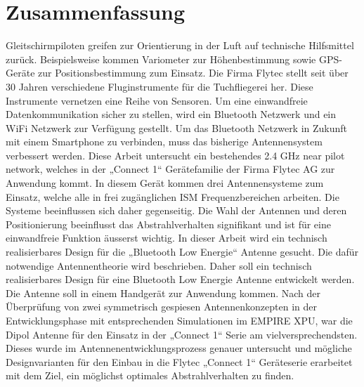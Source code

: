 \section*{Zusammenfassung}

Gleitschirmpiloten greifen zur Orientierung in der Luft auf technische Hilfsmittel zurück. Beispielsweise kommen Variometer zur Höhenbestimmung sowie GPS-Geräte zur Positionsbestimmung zum Einsatz. Die Firma Flytec stellt seit über 30 Jahren verschiedene Fluginstrumente für die Tuchfliegerei her. Diese Instrumente vernetzen eine Reihe von Sensoren. Um eine einwandfreie Datenkommunikation sicher zu stellen, wird ein Bluetooth Netzwerk und ein WiFi Netzwerk zur Verfügung gestellt. Um das Bluetooth Netzwerk in Zukunft mit einem Smartphone zu verbinden, muss das bisherige Antennensystem verbessert werden.
Diese Arbeit untersucht ein bestehendes 2.4 GHz \glqq near pilot network\grqq , welches in der „Connect 1“ Gerätefamilie der Firma Flytec AG zur Anwendung kommt. In diesem  Gerät kommen drei Antennensysteme zum Einsatz, welche alle in frei zugänglichen ISM Frequenzbereichen arbeiten. Die Systeme beeinflussen sich daher gegenseitig. Die Wahl der Antennen und deren Positionierung beeinflusst das Abstrahlverhalten signifikant und ist für eine einwandfreie Funktion äusserst wichtig. In dieser Arbeit wird ein technisch realisierbares Design für die „Bluetooth Low Energie“ Antenne gesucht. Die dafür notwendige Antennentheorie wird beschrieben. Daher soll ein technisch realisierbares Design für eine Bluetooth Low Energie Antenne entwickelt werden. Die Antenne soll in einem Handgerät zur Anwendung kommen. Nach der Überprüfung von zwei symmetrisch gespiesen Antennenkonzepten in der Entwicklungsphase mit entsprechenden Simulationen im EMPIRE XPU, war die Dipol Antenne für den Einsatz in der „Connect 1“ Serie am vielversprechendsten. Dieses wurde im Antennenentwicklungsprozess genauer untersucht und mögliche Designvarianten für den Einbau in die Flytec „Connect 1“ Geräteserie erarbeitet mit dem Ziel, ein möglichst optimales Abstrahlverhalten zu finden.
